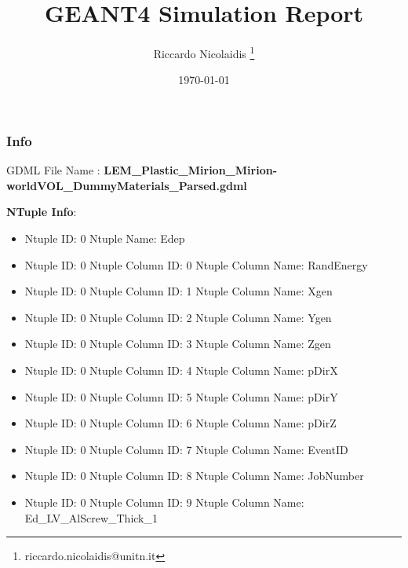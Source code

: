 \documentclass[8pt]{beamer}
\title{GEANT4 Simulation Report}
\author{Riccardo Nicolaidis \footnote{riccardo.nicolaidis@unitn.it}}
\date{\today}
\begin{document}
        
            \begin{frame}
                \titlepage
            \end{frame}
            
            \begin{frame}
                \frametitle{Info}
            
                \centering
                GDML File Name : \textbf{ LEM\_Plastic\_Mirion\_Mirion-worldVOL\_DummyMaterials\_Parsed.gdml}
                
                
                \vspace{2 cm}
                \textbf{NTuple Info}:
                \vspace{1 cm}
                
        \begin{itemize}
        
        \item Ntuple ID: 0 Ntuple Name: Edep
        
        \item Ntuple ID: 0 Ntuple Column ID: 0 Ntuple Column Name: RandEnergy
        
        \item Ntuple ID: 0 Ntuple Column ID: 1 Ntuple Column Name: Xgen
        
        \item Ntuple ID: 0 Ntuple Column ID: 2 Ntuple Column Name: Ygen
        
        \item Ntuple ID: 0 Ntuple Column ID: 3 Ntuple Column Name: Zgen
        
        \item Ntuple ID: 0 Ntuple Column ID: 4 Ntuple Column Name: pDirX
        
        \item Ntuple ID: 0 Ntuple Column ID: 5 Ntuple Column Name: pDirY
        
        \item Ntuple ID: 0 Ntuple Column ID: 6 Ntuple Column Name: pDirZ
        
        \item Ntuple ID: 0 Ntuple Column ID: 7 Ntuple Column Name: EventID
        
        \item Ntuple ID: 0 Ntuple Column ID: 8 Ntuple Column Name: JobNumber
        
        \item Ntuple ID: 0 Ntuple Column ID: 9 Ntuple Column Name: Ed\_LV\_AlScrew\_Thick\_1
        

\end{itemize}
\end{frame}
\end{document}
